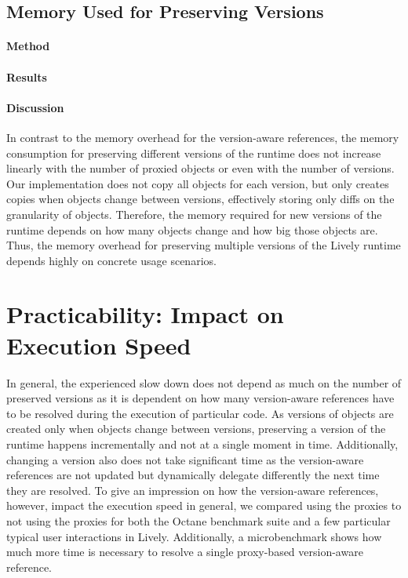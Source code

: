 \subsection{Memory Used for Preserving Versions}

\paragraph{Method}

\paragraph{Results}


\paragraph{Discussion}
In contrast to the memory overhead for the version-aware references, the memory consumption for preserving different versions of the runtime does not increase linearly with the number of proxied objects or even with the number of versions.
Our implementation does not copy all objects for each version, but only creates copies when objects change between versions, effectively storing only diffs on the granularity of objects.
Therefore, the memory required for new versions of the runtime depends on how many objects change and how big those objects are.
Thus, the memory overhead for preserving multiple versions of the Lively runtime depends highly on concrete usage scenarios.




\section{Practicability: Impact on Execution Speed} \label{sec:DISCUSSION:3}



In general, the experienced slow down does not depend as much on the number of preserved versions as it is dependent on how many version-aware references have to be resolved during the execution of particular code.
As versions of objects are created only when objects change between versions, preserving a version of the runtime happens incrementally and not at a single moment in time.
Additionally, changing a version also does not take significant time as the version-aware references are not updated but dynamically delegate differently the next time they are resolved.
To give an impression on how the version-aware references, however, impact the execution speed in general, we compared using the proxies to not using the proxies for both the Octane benchmark suite and a few particular typical user interactions in Lively.
Additionally, a microbenchmark shows how much more time is necessary to resolve a single proxy-based version-aware reference.


